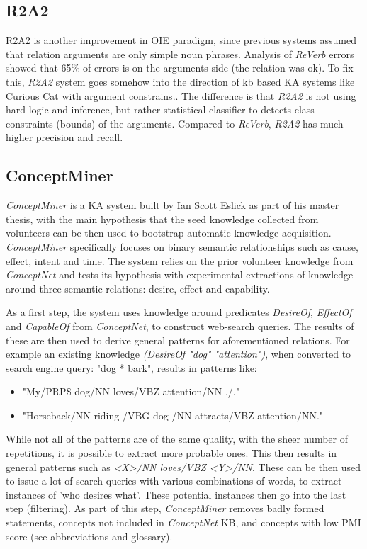 \subsection{R2A2}
\label{section:r:r2a2}
R2A2 is another improvement in OIE paradigm, since previous systems assumed that
relation arguments are only simple noun phrases. Analysis of \emph{ReVerb}
errors showed that 65\% of errors is on the arguments side (the relation was ok).
To fix this, \emph{R2A2} system goes somehow into the direction of kb based
KA systems like Curious Cat with argument constrains.\parencite{Etzioni2011}. 
The difference is that 
\emph{R2A2} is not using hard logic and inference, but rather statistical
classifier to detects class constraints (bounds) of the arguments. Compared to
\emph{ReVerb}, \emph{R2A2} has much higher precision and recall.

\subsection{ConceptMiner}
\label{section:r:conceptminer}
\emph{ConceptMiner} is a KA system built by Ian Scott Eslick as part of his
master thesis\parencite{Eslick2006}, with the main hypothesis that the seed
knowledge collected from volunteers can be then used to bootstrap automatic 
knowledge acquisition. \emph{ConceptMiner} specifically focuses on binary
semantic relationships such as cause, effect, intent and time. The system relies
on the prior volunteer knowledge from \emph{ConceptNet} and tests its 
hypothesis with experimental extractions of knowledge around three semantic
relations: desire, effect and capability.

As a first step, the system uses knowledge around predicates \emph{DesireOf},
\emph{EffectOf} and \emph{CapableOf} from \emph{ConceptNet}, to construct 
web-search queries. The results of these are then used to derive general
patterns for aforementioned relations. For example an existing knowledge
\emph{(DesireOf "dog" "attention")}, when converted to search engine query:
"dog * bark", results in  patterns like:
\begin{itemize}
	\item "My/PRP\$ dog/NN loves/VBZ attention/NN ./."
	\item "Horseback/NN riding /VBG dog /NN attracts/VBZ attention/NN."
\end{itemize}

While not all of the patterns are of the same quality, with the sheer number of
repetitions, it is possible to extract more probable ones. This then results
in general patterns such as \emph{<X>/NN loves/VBZ <Y>/NN}. These can be then
used to issue a lot of search queries with various combinations of words, to 
extract instances of 'who desires what'. These potential instances then go
into the last step (filtering). As part of this step, \emph{ConceptMiner} 
removes badly formed statements, concepts not included in \emph{ConceptNet} KB,
and concepts with low PMI score (see abbreviations and glossary).

